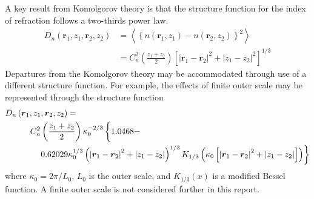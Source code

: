 A key result from Komolgorov theory is that the structure function for the index of refraction follows a two-thirds power law.
\begin{equation}\label{komolgorov}
\begin{aligned}
D_{n}\left(\boldsymbol{r}_{1}, z_{1}, \boldsymbol{r}_{2}, z_{2}\right) & = 
\left\langle \left\{n\left(\boldsymbol{r}_{1}, z_{1}\right) - n\left(\boldsymbol{r}_{2}, z_{2}\right)\right\}^{2} \right\rangle \\
& = 
C_{n}^{2}\left(\frac{z_{1} + z_{2}}{2}\right) \left[ \left\vert \boldsymbol{r}_{1} - \boldsymbol{r}_{2} \right\vert^{2} + \left\vert z_{1} - z_{2} \right\vert^{2}\right]^{1/3}
\end{aligned}
\end{equation}
Departures from the Komolgorov theory may be accommodated through use
of a different structure function.  For example, the effects of finite 
outer scale may be represented through the structure function 
\begin{equation}
\begin{aligned}
&D_{n}\left(\boldsymbol{r}_{1}, z_{1}, \boldsymbol{r}_{2}, z_{2}\right) = \\
&\quad\quad\quad C_{n}^{2}\left(\frac{z_{1} + z_{2}}{2}\right) \kappa_{0}^{-2/3}
\left\{\vphantom{\left(\left\vert \boldsymbol{r}_{1} - \boldsymbol{r}_{2} \right\vert^{2} + \left\vert z_{1} - z_{2} \right\vert\right)^{1/3} }
1.0468 - \right.\\
&\quad\quad\quad\quad 
\left.
0.62029\kappa_{0}^{1/3}\left(\left\vert \boldsymbol{r}_{1} - \boldsymbol{r}_{2} \right\vert^{2} + \left\vert z_{1} - z_{2} \right\vert\right)^{1/3} 
K_{1/3}\left(\kappa_{0}\left[\left\vert \boldsymbol{r}_{1} - \boldsymbol{r}_{2} \right\vert^{2} + \left\vert z_{1} - z_{2} \right\vert\right]\right)\right\}
\end{aligned}
\end{equation}
where $\kappa_{0} = 2\pi / L_{0}$, $L_{0}$ is the outer scale, and
$K_{1/3}\left(x\right)$ is a modified Bessel
function\cite{sasiela2007electromagnetic}.  A finite outer scale is
not considered further in this report.

